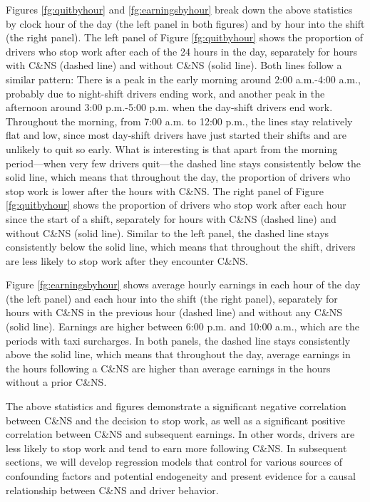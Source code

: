 \documentclass[reviewmode,AEJ]{AEA}
\begin{document}
Figures \ref{fg:quitbyhour} and \ref{fg:earningsbyhour} break down the above statistics by clock hour 
of the day (the left panel in both figures) and by hour into the shift (the right panel). 
The left panel of Figure \ref{fg:quitbyhour} shows the proportion of drivers who stop work after each
of the 24 hours in the day, separately for hours with C\&NS (dashed line) and without C\&NS (solid line).
Both lines follow a similar pattern: There is a peak in the early morning around 2:00 a.m.-4:00 a.m., 
probably due to night-shift drivers ending work, and another peak in the afternoon around 3:00 p.m.-5:00 p.m.
when the day-shift drivers end work. Throughout the morning, from 7:00 a.m. to 12:00 p.m., the lines stay
relatively flat and low, since most day-shift drivers have just started their shifts and are unlikely to 
quit so early. What is interesting is that apart from the morning period---when very few drivers quit---the 
dashed line stays consistently below the solid line, which means that throughout  the day, the proportion
of drivers who stop work is lower after the hours with C\&NS. The right panel of Figure \ref{fg:quitbyhour}
shows the proportion of drivers who stop work after each hour since the start of a shift, separately for
hours with C\&NS (dashed line) and without C\&NS (solid line). Similar to the left panel, the dashed line
stays consistently below the solid line, which means that throughout the shift, drivers are less likely to
stop work after they encounter C\&NS.

Figure \ref{fg:earningsbyhour} shows average hourly earnings in each hour of the day (the left panel) and
each hour into the shift (the right panel), separately for hours with C\&NS in the previous hour 
(dashed line) and without any C\&NS (solid line). Earnings are higher between 6:00 p.m. and 10:00 a.m.,
which are the periods with taxi surcharges. In both panels, the dashed line stays consistently 
above the solid line, which means that throughout the day, average earnings in the hours following a 
C\&NS are higher than  average earnings in the hours without a prior C\&NS.

The above statistics and figures demonstrate a significant negative correlation between C\&NS and the 
decision to stop work, as well as a significant positive correlation between C\&NS and subsequent earnings.
In other words, drivers are less likely to stop work and tend to earn more following C\&NS. In subsequent
sections, we will develop regression models  that control for various sources of confounding factors and
potential endogeneity and present evidence for a causal relationship between C\&NS and driver behavior.
\end{document}
